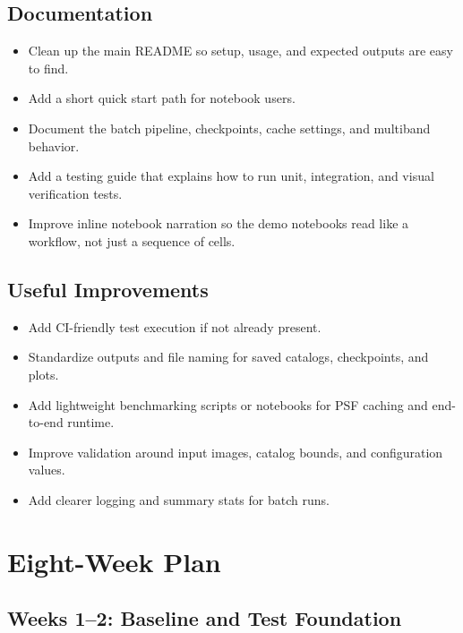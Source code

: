 \documentclass[11pt]{article}
\begin{document}
\subsection{Documentation}

\begin{itemize}
    \item Clean up the main README so setup, usage, and expected outputs are easy to find.
    \item Add a short quick start path for notebook users.
    \item Document the batch pipeline, checkpoints, cache settings, and multiband behavior.
    \item Add a testing guide that explains how to run unit, integration, and visual verification tests.
    \item Improve inline notebook narration so the demo notebooks read like a workflow, not just a sequence of cells.
\end{itemize}

\subsection{Useful Improvements}

\begin{itemize}
    \item Add CI-friendly test execution if not already present.
    \item Standardize outputs and file naming for saved catalogs, checkpoints, and plots.
    \item Add lightweight benchmarking scripts or notebooks for PSF caching and end-to-end runtime.
    \item Improve validation around input images, catalog bounds, and configuration values.
    \item Add clearer logging and summary stats for batch runs.
\end{itemize}

\section{Eight-Week Plan}

\subsection{Weeks 1--2: Baseline and Test Foundation}
\end{document}

